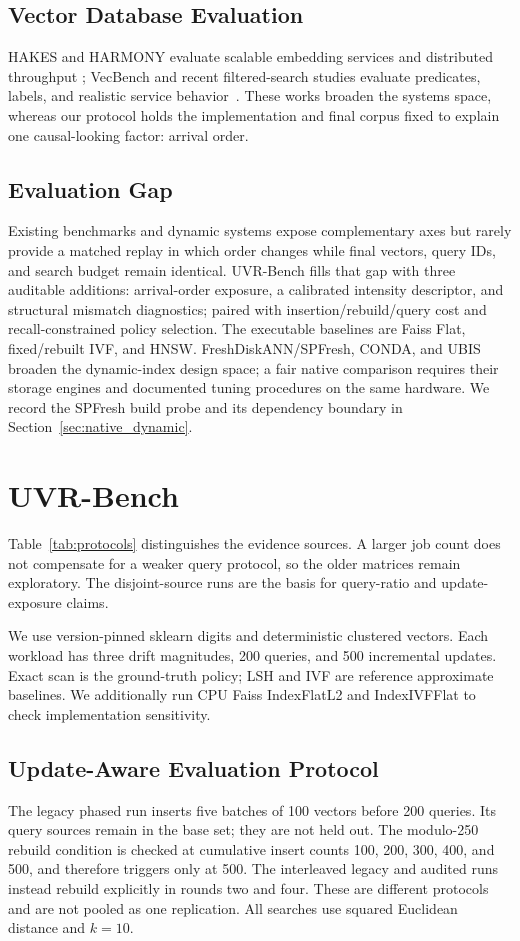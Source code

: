 \subsection{Vector Database Evaluation}
HAKES and HARMONY evaluate scalable embedding services and distributed throughput
\cite{hakes,harmony}; VecBench and recent filtered-search studies evaluate predicates,
labels, and realistic service behavior~\cite{vecbench,sieve,filteredreview,rwalks,
dynamicrange,tagfiltered,cgif,gaaf}. These works broaden the systems
space, whereas our protocol holds the implementation and final corpus fixed to explain
one causal-looking factor: arrival order.

\subsection{Evaluation Gap}
Existing benchmarks and dynamic systems expose complementary axes but rarely provide a
matched replay in which order changes while final vectors, query IDs, and search budget
remain identical. UVR-Bench fills that gap with three auditable additions: arrival-order
exposure, a calibrated intensity descriptor, and structural mismatch diagnostics;
paired with insertion/rebuild/query cost and recall-constrained policy selection. The
executable baselines are Faiss Flat, fixed/rebuilt IVF, and HNSW. FreshDiskANN/SPFresh,
CONDA, and UBIS broaden the dynamic-index design space; a fair native comparison requires
their storage engines and documented tuning procedures on the same hardware. We record
the SPFresh build probe and its dependency boundary in Section~\ref{sec:native_dynamic}.

\section{UVR-Bench}
Table~\ref{tab:protocols} distinguishes the evidence sources. A larger job count does
not compensate for a weaker query protocol, so the older matrices remain exploratory.
The disjoint-source runs are the basis for query-ratio and update-exposure claims.

We use version-pinned sklearn digits and deterministic clustered vectors. Each workload has three drift magnitudes, 200 queries, and 500 incremental updates. Exact scan is the ground-truth policy; LSH and IVF are reference approximate baselines. We additionally run CPU Faiss IndexFlatL2 and IndexIVFFlat to check implementation sensitivity.
\subsection{Update-Aware Evaluation Protocol}
The legacy phased run inserts five batches of 100 vectors before 200 queries. Its query
sources remain in the base set; they are not held out. The modulo-250 rebuild condition
is checked at cumulative insert counts 100, 200, 300, 400, and 500, and therefore triggers
only at 500. The interleaved legacy and audited runs instead rebuild explicitly in rounds
two and four. These are different protocols and are not pooled as one replication.
All searches use squared Euclidean distance and $k=10$.
